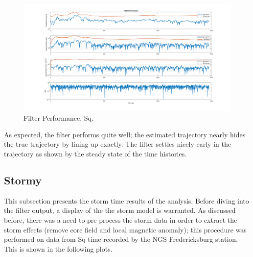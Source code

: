 \documentclass[conf]{new-aiaa}
\begin{document}
\begin{figure}[H]
\centering
\includegraphics[width=1.0\textwidth]{figures/filter_quiet.png}
\caption{Filter Performance, Sq.}
\end{figure}

As expected, the filter performs quite well; the estimated trajectory nearly hides the true trajectory by lining up exactly. The filter settles nicely early in the trajectory as shown by the steady state of the time histories.

\subsection{Stormy} %

This subsection presents the storm time results of the analysis. Before diving into the filter output, a display of the the storm model is warranted. As discussed before, there was a need to pre process the storm data in order to extract the storm effects (remove core field and local magnetic anomaly); this procedure was performed on data from Sq time recorded by the NGS Fredericksburg station. This is shown in the following plots.

\begin{figure}[H]
\hfill
{}
\hfill
{}
\hfill
\end{figure}
\end{document}
